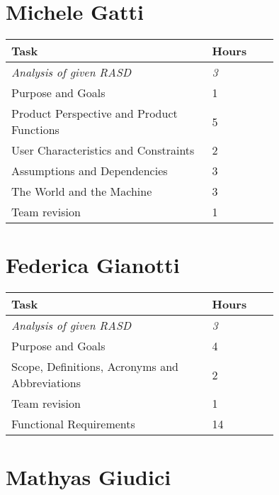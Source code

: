 \section{Michele Gatti}

\smallskip
\begin{center}
\begin{tabular}{ | p{0.75\linewidth} | l | }
  \hline
    \textbf{Task} & \textbf{Hours }\\ \hline
    \textit{Analysis of given RASD} & \textit{3} \\ \hline
    Purpose and Goals & 1 \\ \hline
    Product Perspective and Product Functions & 5 \\ \hline
    User Characteristics and Constraints & 2 \\ \hline
    Assumptions and Dependencies & 3 \\ \hline
    The World and the Machine & 3 \\ \hline
    Team revision & 1 \\ \hline
\end{tabular}
\end{center}
\smallskip


\section{Federica Gianotti}

\smallskip
\begin{center}
\begin{tabular}{ | p{0.75\linewidth} | l | }
  \hline
    \textbf{Task} & \textbf{Hours }\\ \hline
    \textit{Analysis of given RASD} & \textit{3} \\ \hline
    Purpose and Goals & 4 \\ \hline
    Scope, Definitions, Acronyms and Abbreviations & 2 \\ \hline
    Team revision & 1 \\ \hline
    Functional Requirements & 14 \\ \hline
\end{tabular}
\end{center}
\smallskip

\section{Mathyas Giudici}


